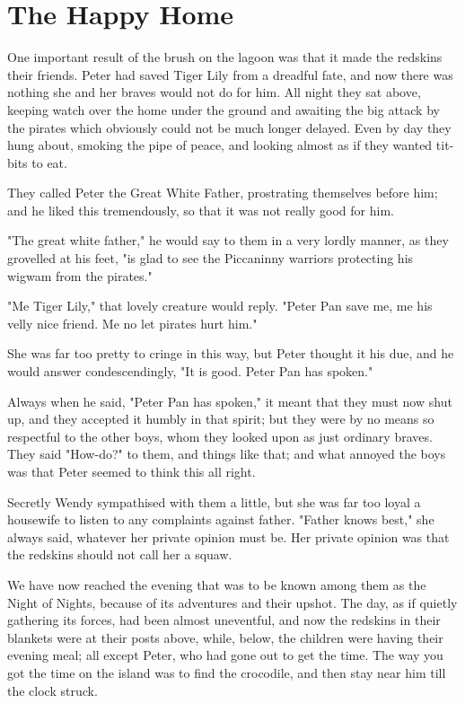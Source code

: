 
\chapter{The Happy Home}

One important result of the brush on the lagoon was that it made the redskins their friends.
Peter had saved Tiger Lily from a dreadful fate,
and now there was nothing she and her braves would not do for him.
All night they sat above,
keeping watch over the home under the ground and awaiting the big attack by the pirates
which obviously could not be much longer delayed.
Even by day they hung about, smoking the pipe of peace, and looking almost as if they wanted tit-bits to eat.

They called Peter the Great White Father, prostrating themselves before him;
and he liked this tremendously, so that it was not really good for him.

"The great white father," he would say to them in a very lordly manner, as they grovelled at his feet,
"is glad to see the Piccaninny warriors protecting his wigwam from the pirates."

"Me Tiger Lily," that lovely creature would reply.
"Peter Pan save me, me his velly nice friend.
Me no let pirates hurt him."

She was far too pretty to cringe in this way, but Peter thought it his due,
and he would answer condescendingly, "It is good.
Peter Pan has spoken."

Always when he said, "Peter Pan has spoken," it meant that they must now shut up,
and they accepted it humbly in that spirit;
but they were by no means so respectful to the other boys,
whom they looked upon as just ordinary braves.
They said "How-do?\@" to them, and things like that;
and what annoyed the boys was that Peter seemed to think this all right.

Secretly Wendy sympathised with them a little,
but she was far too loyal a housewife to listen to any complaints against father.
"Father knows best," she always said, whatever her private opinion must be.
Her private opinion was that the redskins should not call her a squaw.

We have now reached the evening that was to be known among them as the Night of Nights,
because of its adventures and their upshot.
The day, as if quietly gathering its forces, had been almost uneventful,
and now the redskins in their blankets were at their posts above,
while, below, the children were having their evening meal;
all except Peter, who had gone out to get the time.
The way you got the time on the island was to find the crocodile,
and then stay near him till the clock struck.


